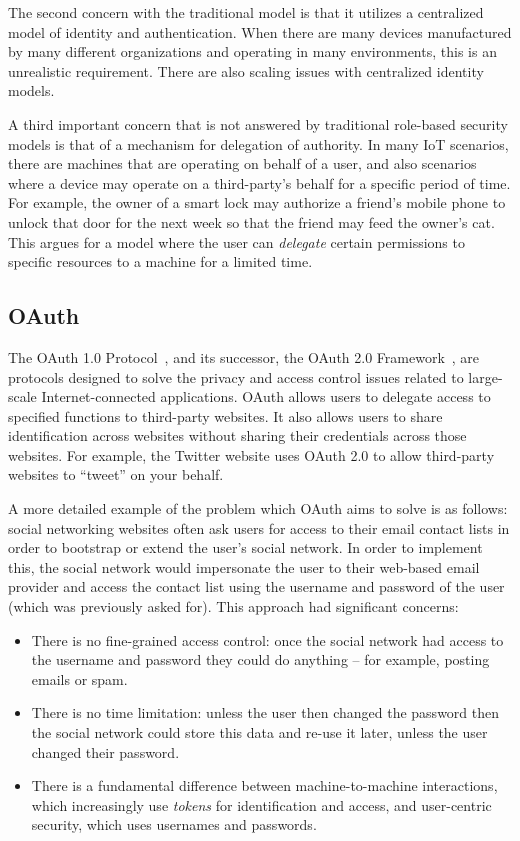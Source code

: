 \documentclass{llncs}
\begin{document}
The second concern with the traditional model is that it utilizes a centralized model of identity and authentication.
 When there are many devices manufactured by many different organizations and operating in many environments, this is an unrealistic 
requirement. There are also scaling issues with centralized identity models.

A third important concern that is not answered by traditional role-based security models is that of a mechanism for delegation of authority.
In many IoT scenarios, there are machines that are operating on behalf of a user, and also scenarios where a device may operate on a third-party's
behalf for a specific period of time. For example, the owner of a smart lock may authorize a friend's mobile phone to unlock that door
for the next week so that the friend may feed the owner's cat. This argues for a model where the user can \emph{delegate} certain permissions to specific resources to a machine for 
a limited time. 
\subsection{OAuth}
The OAuth 1.0 Protocol~\cite{rfc5849}, and its successor,
the OAuth 2.0 Framework~\cite{rfc6749}, are protocols
designed to solve the privacy and access control issues related to large-scale Internet-connected applications.
OAuth allows 
users to delegate access to specified functions to third-party websites. It also allows users to 
share identification across websites without sharing their credentials across those websites. 
For example, the Twitter website uses OAuth 2.0 to allow third-party websites to ``tweet'' 
on your behalf.

A more detailed example of the problem which OAuth aims to solve is as follows: social networking websites often ask users for access to their email contact
lists in order to bootstrap or extend the user's social network. In order to implement this, the social
network would impersonate the user to their web-based email provider and access the contact list using the username and password of the user (which was previously asked for). 
This approach had significant concerns: 
\begin{itemize}
\item There is no fine-grained access control: once the social network had access to the username and password
they could do anything -- for example, posting emails or spam.
\item There is no time limitation: unless the user then changed the password then the social network 
could store this data and re-use it later, unless the user changed their password.
\item There is a fundamental difference between machine-to-machine interactions, which increasingly use \emph{tokens} 
for identification and access, and user-centric security, which uses usernames and passwords. 
\end{itemize}
\end{document}
